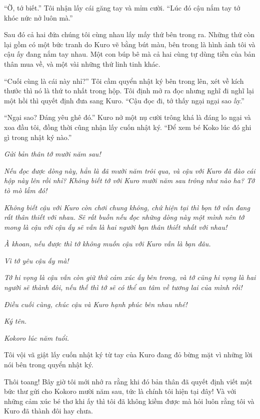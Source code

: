 {``Ờ, tớ biết.'' Tôi nhận lấy cái găng tay và mỉm cười. ``Lúc đó cậu nắm
tay tớ khóc nức nở luôn mà.''

Sau đó cả hai đứa chúng tôi cùng nhau lấy mấy thứ bên trong ra. Những
thứ còn lại gồm có một bức tranh do Kuro vẽ bằng bút màu, bên trong là
hình ảnh tôi và cậu ấy đang nắm tay nhau. Một con búp bê mà cả hai cùng
tự dùng tiền của bản thân mua về, và một vài những thứ linh tinh khác.

``Cuối cùng là cái này nhỉ?'' Tôi cầm quyển nhật ký bên trong lên, xét
về kích thước thì nó là thứ to nhất trong hộp. Tôi định mở ra đọc nhưng
nghĩ đi nghĩ lại một hồi thì quyết định đưa sang Kuro. ``Cậu đọc đi, tớ
thấy ngại ngại sao ấy.''

``Ngại sao? Đáng yêu ghê đó.'' Kuro nở một nụ cười trông khá là đáng lo
ngại và xoa đầu tôi, đồng thời cũng nhận lấy cuốn nhật ký. ``Để xem bé
Koko lúc đó ghi gì trong nhật ký nào.''

\emph{Gửi bản thân tớ mười năm sau!}

\emph{Nếu đọc được dòng này, hẳn là đã mười năm trôi qua, và cậu với
Kuro đã đào cái hộp này lên rồi nhỉ? Không biết tớ với Kuro mười năm sau
trông như nào ha? Tớ tò mò lắm đó!}

\emph{Không biết cậu với Kuro còn chơi chung không, chứ hiện tại thì bọn
tớ vẫn đang rất thân thiết với nhau. Sẽ rất buồn nếu đọc những dòng này
một mình nên tớ mong là cậu với cậu ấy sẽ vẫn là hai người bạn thân
thiết nhất với nhau!}

\emph{À khoan, nếu được thì tớ không muốn cậu với Kuro vẫn là bạn đâu.}

\emph{Vì tớ yêu cậu ấy mà!}

\emph{Tớ hi vọng là cậu vẫn còn giữ thứ cảm xúc ấy bên trong, và tớ cũng
hi vọng là hai người sẽ thành đôi, nếu thế thì tớ sẽ có thể an tâm về
tương lai của mình rồi!}

\emph{Điều cuối cùng, chúc cậu và Kuro hạnh phúc bên nhau nhé!}

\emph{Ký tên.}

\emph{Kokoro lúc năm tuổi.}

Tôi vội vã giật lấy cuốn nhật ký từ tay của Kuro đang đỏ bừng mặt vì
những lời nói bên trong quyển nhật ký.

Thôi toang! Bây giờ tôi mới nhớ ra rằng khi đó bản thân đã quyết định
viết một bức thư gửi cho Kokoro mười năm sau, tức là chính tôi hiện tại
đây! Và với những cảm xúc bé thơ khi ấy thì tôi đã không kiềm được mà
hỏi luôn rằng tôi và Kuro đã thành đôi hay chưa.

}
